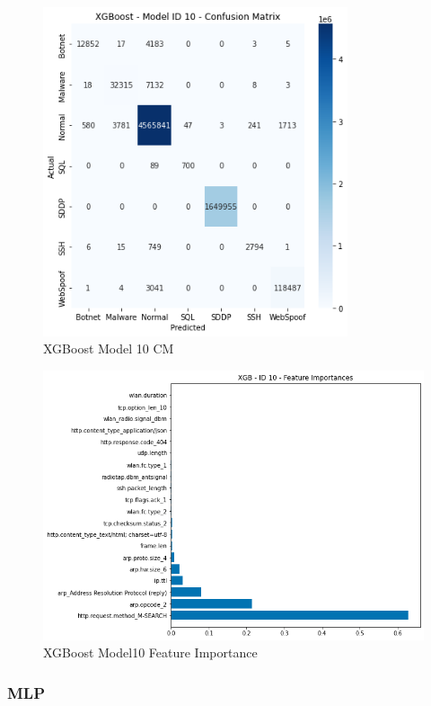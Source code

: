 \begin{figure}[H]
	\centering
	\includegraphics[width=0.8\textwidth]{Appendices/Images/XGB/Model10/XGB_Model10_CM.png}
	\caption{XGBoost Model 10 CM}
  	\label{fig:xgb_model10_cm}
\end{figure}

\begin{figure}[H]
	\centering
	\includegraphics[width=\textwidth]{Appendices/Images/XGB/Model10/XGB_Model10_FI.png}
	\caption{XGBoost Model10 Feature Importance}
  	\label{fig:xgb_model10_fi}
\end{figure}


\subsubsection*{MLP}

